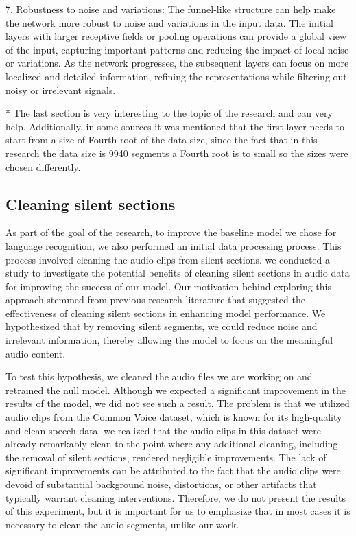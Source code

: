 \documentclass[a4paper]{article}
\begin{document}
7. Robustness to noise and variations: The funnel-like structure can help make the network more robust to noise and variations in the input data. The initial layers with larger receptive fields or pooling operations can provide a global view of the input, capturing important patterns and reducing the impact of local noise or variations. As the network progresses, the subsequent layers can focus on more localized and detailed information, refining the representations while filtering out noisy or irrelevant signals.\newline

* The last section is very interesting to the topic of the research and can very help. Additionally, in some sources it was mentioned that the first layer needs to start from a size of Fourth root of the data size, since the fact that in this research the data size is 9940 segments a Fourth root is to small so the sizes were chosen differently.

\subsection{Cleaning silent sections}
As part of the goal of the research, to improve the baseline model we chose for language recognition, we also performed an initial data processing process. This process involved cleaning the audio clips from silent sections.
we conducted a study to investigate the potential benefits of cleaning silent sections in audio data for improving the success of our model. Our motivation behind exploring this approach stemmed from previous research literature that suggested the effectiveness of cleaning silent sections in enhancing model performance. We hypothesized that by removing silent segments, we could reduce noise and irrelevant information, thereby allowing the model to focus on the meaningful audio content.

To test this hypothesis, we cleaned the audio files we are working on and retrained the null model. Although we expected a significant improvement in the results of the model, we did not see such a result. The problem is that
we utilized audio clips from the Common Voice dataset, which is known for its high-quality and clean speech data. we realized that the audio clips in this dataset were already remarkably clean to the point where any additional cleaning, including the removal of silent sections, rendered negligible improvements. The lack of significant improvements can be attributed to the fact that the audio clips were devoid of substantial background noise, distortions, or other artifacts that typically warrant cleaning interventions.
Therefore, we do not present the results of this experiment, but it is important for us to emphasize that in most cases it is necessary to clean the audio segments, unlike our work.
\end{document}
